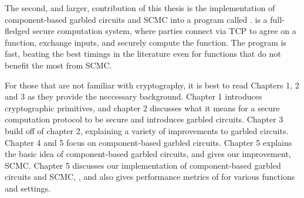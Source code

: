 The second, and larger, contribution of this thesis is the implementation of component-based garbled circuits and SCMC into a program called \CompGC. 
\CompGC is a full-fledged secure computation system, where parties connect via TCP to agree on a function, exchange inputs, and securely compute the function.
The program is fast, beating the best timings in the literature even for functions that do not benefit the most from SCMC.

For those that are not familiar with cryptography, it is best to read Chapters 1, 2 and 3 as they provide the neccessary background.
Chapter 1 introduces cryptographic primitives, and chapter 2 discusses what it means for a secure computation protocol to be secure and introduces garbled circuits.
Chapter 3 build off of chapter 2, explaining a variety of improvements to garbled circuits.
Chapter 4 and 5 focus on component-based garbled circuits.
Chapter 5 explains the basic idea of component-based garbled circuits, and gives our improvement, SCMC.
Chapter 5 discusses our implementation of component-based garbled circuits and SCMC, \CompGC, and also gives performance metrics of \CompGC for various functions and settings.








